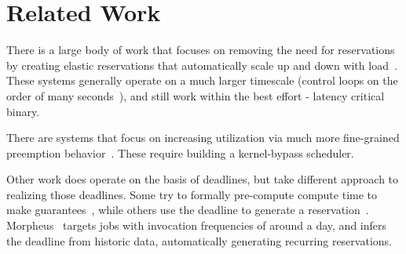 \section{Related Work}

There is a large body of work that focuses on removing the need for
reservations by creating elastic reservations that automatically scale up and
down with load~\cite*{kubernetes, snowflake}. These systems generally
operate on a much larger timescale (control loops on the order of many
seconds~\cite{kubernetestime}), and still work within the best effort
- latency critical binary. 

There are systems that focus on increasing utilization via much more
fine-grained preemption behavior~\cite*{caladan, shinjuku}. These require
building a kernel-bypass scheduler. 

Other work does operate on the basis of deadlines, but take different approach
to realizing those deadlines. Some try to formally pre-compute compute time to
make guarantees~\cite{jockey}, while others use the deadline to generate a
reservation~\cite*{rayon}. Morpheus~\cite*{morpheus} targets jobs with
invocation frequencies of around a day, and infers the deadline from historic
data, automatically generating recurring reservations.

